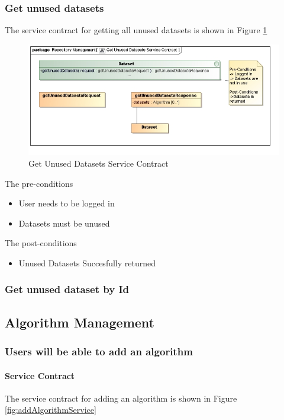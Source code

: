 \subsubsection {Get unused datasets}
The service contract for getting all unused datasets is shown in Figure \ref{fig:getUnusedDatasetsService}
\begin{figure}[H]
  \begin{center}
  \includegraphics[scale=0.6]{../Diagrams and Charts/Test Data/Get Unused Datasets Service Contract.jpg}
  \caption{Get Unused Datasets Service Contract}
  \label{fig:getUnusedDatasetsService}
  \end{center}
  
\end{figure}

The pre-conditions
\begin{itemize}
  \item User needs to be logged in
  \item Datasets must be unused
\end{itemize}

The post-conditions
\begin{itemize}
  \item Unused Datasets Succesfully returned
\end{itemize}
\subsubsection {Get unused dataset by Id}

\subsection{Algorithm Management}
\subsubsection {Users will be able to add an algorithm}
\paragraph{Service Contract}
The service contract for adding an algorithm is shown in Figure \ref{fig:addAlgorithmService}

